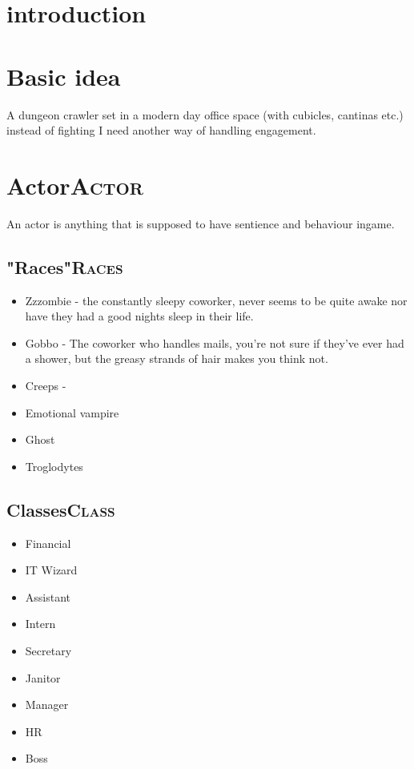 \documentclass[11pt]{article}
\date{}
\title{}
\begin{document}
\tableofcontents



\section{introduction}
\label{sec:org30fbc15}

\section{Basic idea}
\label{sec:orge5f1cb4}

A dungeon crawler set in a modern day office space (with cubicles, cantinas etc.) instead of fighting I need another way of handling engagement.

\section{Actor\hfill{}\textsc{Actor}}
\label{sec:org0c34810}

An actor is anything that is supposed to have sentience and behaviour ingame.

\subsection{"Races"\hfill{}\textsc{Races}}
\label{sec:org79d5564}

\begin{itemize}
\item Zzzombie - the constantly sleepy coworker, never seems to be quite awake nor have they had a good nights sleep in their life.
\item Gobbo - The coworker who handles mails, you're not sure if they've ever had a shower, but the greasy strands of hair makes you think not.
\item Creeps -
\item Emotional vampire
\item Ghost
\item Troglodytes
\end{itemize}


\subsection{Classes\hfill{}\textsc{Class}}
\label{sec:orga7c3347}

\begin{itemize}
\item Financial
\item IT Wizard
\item Assistant
\item Intern
\item Secretary
\item Janitor
\item Manager
\item HR
\item Boss
\end{itemize}
\end{document}
